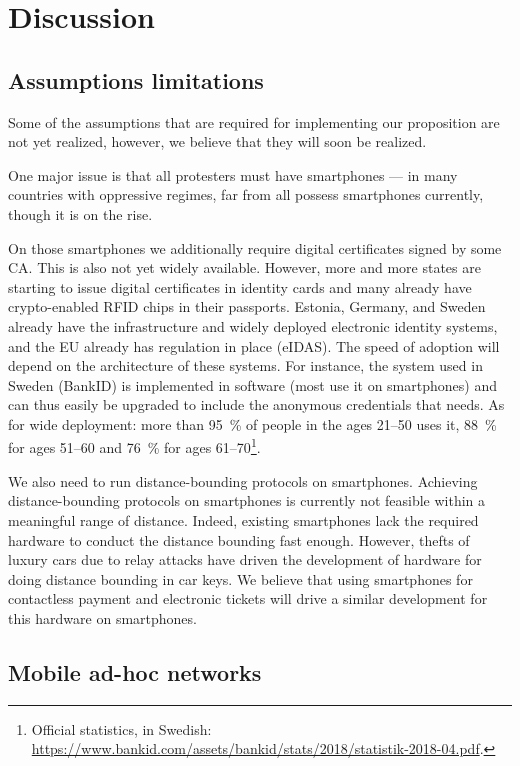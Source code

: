\section{Discussion}%
\label{Discussion}

\subsection{Assumptions limitations} 

Some of the assumptions that are required for implementing our proposition are 
not yet realized, however, we believe that they will soon be realized.

One major issue is that all protesters must have smartphones --- in many 
countries with oppressive regimes, far from all possess smartphones
currently, though it is on the rise.

On those smartphones we additionally require digital certificates signed by 
some \ac{CA}.
This is also not yet widely available.
However, more and more states are starting to issue digital certificates in 
identity cards and many already have crypto-enabled RFID chips in their 
passports.
\Eg Estonia, Germany, and Sweden already have the infrastructure and widely 
deployed electronic identity systems, and the EU already has regulation in 
place (eIDAS).
The speed of adoption will depend on the architecture of these systems.
For instance, the system used in Sweden (BankID) is implemented in software 
(most use it on smartphones) and can thus easily be upgraded to include the 
anonymous credentials that \CROCUS needs.
As for wide deployment: more than \SI{95}{\%} of people in the ages 21--50 uses 
it, \SI{88}{\%} for ages 51--60 and \SI{76}{\%} for ages 61--70\footnote{%
  Official statistics, in Swedish:  
  \url{https://www.bankid.com/assets/bankid/stats/2018/statistik-2018-04.pdf}.
}.

We also need to run distance-bounding protocols on smartphones.
Achieving distance-bounding protocols on smartphones is currently not feasible 
within a meaningful range of distance.
Indeed, existing smartphones lack the required hardware to conduct the distance 
bounding fast enough.
However, thefts of luxury cars due to relay attacks have driven the development 
of hardware for doing distance bounding in car keys.
We believe that using smartphones for contactless payment and electronic 
tickets will drive a similar development for this hardware on smartphones.


\subsection{Mobile ad-hoc networks}

